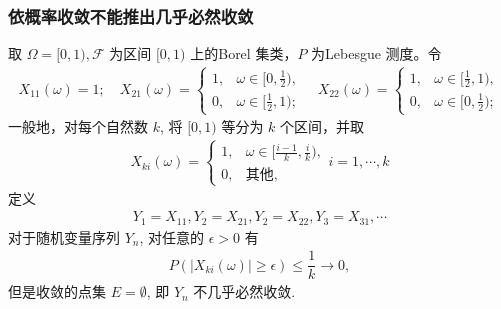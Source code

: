 \documentclass[Prob-All.tex]{subfiles}
\begin{document}
\begin{frame}
	\frametitle{依概率收敛不能推出几乎必然收敛}
	\begin{exam}
		取 $\Omega=[0,1), \mathcal{F}$ 为区间 $[0,1)$ 上的{\rm Borel} 集类，$P$ 为{\rm Lebesgue} 测度。令
		\begin{eqnarray*}
			X_{11}(\omega)=1; \quad
			X_{21}(\omega)=\left\{
			\begin{array}{ll}
				1, &\omega\in [0,\frac{1}{2}),\\
				0, &\omega\in [\frac{1}{2},1);
			\end{array}
			\right.\quad
			X_{22}(\omega)=\left\{
			\begin{array}{ll}
				1, &\omega\in [\frac{1}{2},1),\\
				0, &\omega\in [0,\frac{1}{2});
			\end{array}
			\right.
		\end{eqnarray*}
		一般地，对每个自然数 $k$, 将 $[0,1)$ 等分为 $k$ 个区间，并取
		\begin{eqnarray*}
			X_{ki}(\omega)=\left\{
			\begin{array}{ll}
				1, &\omega\in [\frac{i-1}{k},\frac{i}{k}),\\
				0, &\mbox{其他},
			\end{array}
			\right. i=1,\cdots, k
		\end{eqnarray*}
		定义
		\begin{eqnarray*}
			Y_1=X_{11}, Y_2=X_{21}, Y_2=X_{22}, Y_3=X_{31}, \cdots
		\end{eqnarray*}
		对于随机变量序列 $Y_n$, 对任意的 $\epsilon>0$ 有
		\begin{eqnarray*}
			P(|X_{ki}(\omega)|\geq \epsilon)\leq \dfrac{1}{k}\rightarrow 0,
		\end{eqnarray*}
		但是收敛的点集 $E=\emptyset$, 即 $Y_n$ 不几乎必然收敛.
	\end{exam}

\end{frame}
\end{document}
